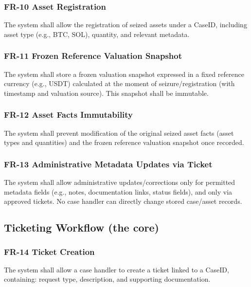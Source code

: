 \documentclass[12pt,a4paper]{report}
\begin{document}
\subsubsection{FR-10 Asset Registration}

The system shall allow the registration of seized assets under a CaseID, including asset type (e.g., BTC, SOL), quantity, and relevant metadata.

\subsubsection{FR-11 Frozen Reference Valuation Snapshot}

The system shall store a frozen valuation snapshot expressed in a fixed reference currency (e.g., USDT) calculated at the moment of seizure/registration (with timestamp and valuation source). This snapshot shall be immutable.

\subsubsection{FR-12 Asset Facts Immutability}

The system shall prevent modification of the original seized asset facts (asset types and quantities) and the frozen reference valuation snapshot once recorded.

\subsubsection{FR-13 Administrative Metadata Updates via Ticket}

The system shall allow administrative updates/corrections only for permitted metadata fields (e.g., notes, documentation links, status fields), and only via approved tickets. No case handler can directly change stored case/asset records.

\subsection{Ticketing Workflow (the core)}

\subsubsection{FR-14 Ticket Creation}

The system shall allow a case handler to create a ticket linked to a CaseID, containing: request type, description, and supporting documentation.
\end{document}
